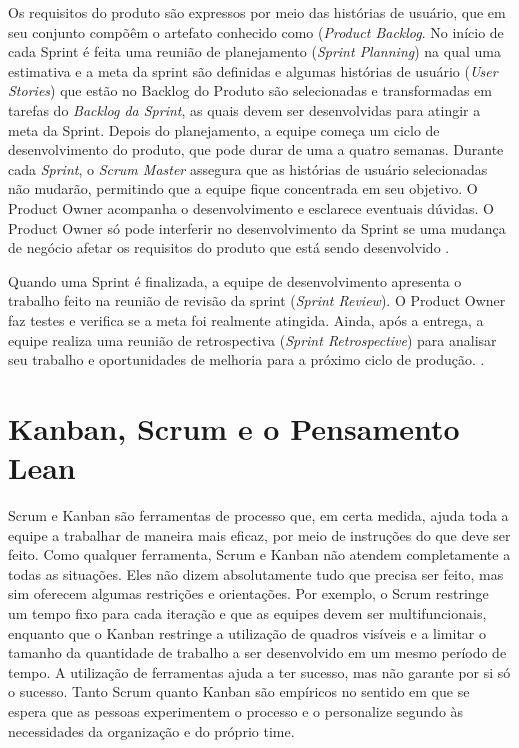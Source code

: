 Os requisitos do produto são expressos por meio das histórias de usuário, que em seu conjunto compõêm o artefato conhecido como (\textit{Product Backlog}. No início de cada Sprint é feita uma reunião de planejamento (\textit{Sprint Planning}) na qual uma estimativa e a meta da sprint são definidas e algumas histórias de usuário (\textit{User Stories}) que estão no Backlog do Produto são selecionadas e transformadas em tarefas do \textit{Backlog da Sprint}, as quais devem ser desenvolvidas para atingir a meta da Sprint. Depois do planejamento, a equipe começa um ciclo de desenvolvimento do produto, que pode durar de uma a quatro semanas. Durante cada \textit{Sprint}, o \textit{Scrum Master} assegura que as histórias de usuário selecionadas não mudarão, permitindo que a equipe fique concentrada em seu objetivo. O Product Owner acompanha o desenvolvimento e esclarece eventuais dúvidas. O Product Owner só pode interferir no desenvolvimento da Sprint se uma mudança de negócio afetar os requisitos do produto que está sendo desenvolvido  \cite{jeff}.

Quando uma Sprint é finalizada, a equipe de desenvolvimento apresenta o trabalho feito na reunião de revisão da sprint (\textit{Sprint Review}). O Product Owner faz testes e verifica se a meta foi realmente atingida. Ainda, após a entrega, a equipe realiza uma reunião de retrospectiva (\textit{Sprint Retrospective}) para analisar seu trabalho e oportunidades de melhoria para a próximo ciclo de produção.   \cite{jeff}. 

\section[Kanban, Scrum e o Pensamento Lean ]{Kanban, Scrum e o Pensamento Lean }

Scrum e Kanban são ferramentas de processo que, em certa medida, ajuda toda a equipe a trabalhar de maneira mais eficaz, por meio de instruções do que deve ser feito. Como qualquer ferramenta, Scrum e Kanban não atendem completamente a todas as situações. Eles não dizem absolutamente tudo que precisa ser feito, mas sim oferecem algumas restrições e orientações. Por exemplo, o Scrum restringe um tempo fixo para cada iteração e que as equipes devem ser multifuncionais, enquanto que o Kanban restringe a utilização de quadros visíveis e a limitar o tamanho da quantidade de trabalho a ser desenvolvido em um mesmo período de tempo. A utilização de ferramentas ajuda a ter sucesso, mas não garante por si só o sucesso. Tanto Scrum quanto Kanban são empíricos no sentido em que se espera que as pessoas experimentem o processo e o personalize segundo às necessidades da organização e do próprio time.

